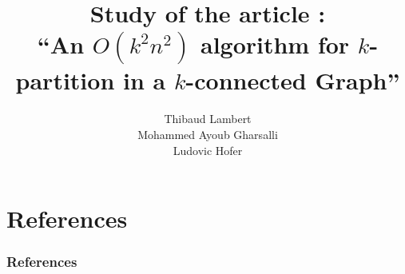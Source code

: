 \documentclass[xcolor=dvipsnames]{beamer}
\title[$O(k^2n^2)$ algorithm for $k$-partitioning]{Study of the article :\\``An $O(k^2n^2)$ algorithm for $k$-partition in a $k$-connected Graph''}
\author[Lambert, Gharsalli, Hofer]
       {Thibaud Lambert\\Mohammed Ayoub Gharsalli\\Ludovic Hofer}
\institute{Université de Bordeaux}
\begin{document}
\begin{frame}[plain]
  \maketitle
\end{frame}







\section*{References}
\begin{frame}[allowframebreaks]
  \frametitle{References}
  \printbibliography
\end{frame}
\end{document}
